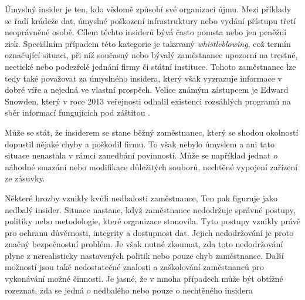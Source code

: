 Úmyslný insider je ten, kdo vědomě způsobí své organizaci újmu.
Mezi příklady se řadí krádeže dat, úmyslné poškození infrastruktury nebo vydání přístupu třetí neoprávněné osobě.
Cílem těchto insiderů bývá často pomsta nebo jen peněžní zisk.
Speciálním případem této kategorie je takzvaný \textit{whistleblowing}, což termín označující situaci, při níž současný nebo bývalý zaměstnanec upozorní na trestné, neetické nebo podezřelé jednání firmy či státní instituce.
Tohoto zaměstnance lze tedy také považovat za úmyslného insidera, který však vyzrazuje informace v dobré víře a nejedná ve vlastní prospěch.
Velice známým zástupcem je Edward Snowden, který v roce 2013 veřejnosti odhalil existenci rozsáhlých programů na sběr informací fungujících pod záštitou \cite{Edward_Snowden}.

Může se stát, že insiderem se stane běžný zaměstnanec, který se shodou okolností dopustil nějaké chyby a poškodil firmu.
To však nebylo úmyslem a ani tato situace nenastala v rámci zanedbání povinností.
Může se například jednat o náhodné smazání nebo modifikace důležitých souborů, nechtěné vypojení zařízení ze zásuvky.

Některé hrozby vznikly kvůli nedbalosti zaměstnance,
Ten pak figuruje jako nedbalý insider.
Situace nastane, když zaměstnanec nedodržuje správné postupy, politiky nebo metodologie, které organizace stanovila.
Tyto postupy vznikly právě pro ochranu důvěrnosti, integrity a dostupnost dat.
Jejich nedodržování je proto značný bezpečnostní problém.
Je však nutné zkoumat, zda toto nedodržování plyne z nerealisticky nastavených politik nebo pouze chyb zaměstnance.
Další možností jsou také nedostatečné znalosti a zaškolování zaměstnanců pro vykonávání možné činnosti.
Je jasné, že v mnoha případech může být obtížné rozeznat, zda se jedná o nedbalého nebo pouze o nechtěného insidera


